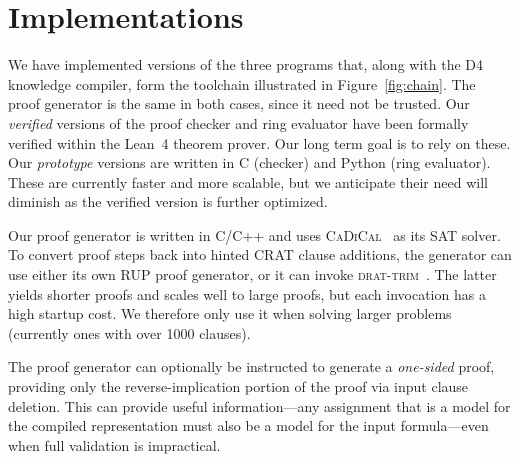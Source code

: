 \documentclass[letterpaper,USenglish,cleveref, autoref, thm-restate]{lipics-v2021}
\newcommand{\progname}[1]{\textsc{#1}}
\newcommand{\dfour}{\progname{D4}}
\newcommand{\cadical}{\progname{CaDiCal}}
\newcommand{\dtrim}{\progname{drat-trim}}
\newcommand{\lean}{Lean~4}
\begin{document}
\section{Implementations}
We have implemented versions of the three programs that, along with
the \dfour{} knowledge compiler, form the toolchain illustrated in
Figure~\ref{fig:chain}.  The proof generator is the same in both
cases, since it need not be trusted.
Our {\em verified}
versions of the proof checker and ring evaluator have been formally
verified within the \lean{} theorem prover.  Our long term goal is to
rely on these.  Our {\em prototype} versions are written in C
(checker) and Python (ring evaluator).  These are currently faster and
more scalable, but we anticipate their need will diminish as the
verified version is further optimized.

Our proof generator is written in C/C++ and uses
\cadical{}~\cite{biere-cadical-2019} as its SAT solver.  To convert
proof steps back into hinted CRAT clause additions, the generator can
use either its own RUP proof generator, or it can invoke
\dtrim{}~\cite{RAT}.  The latter yields shorter proofs and scales well
to large proofs, but each invocation has a high startup cost.  We
therefore only use it when solving larger problems (currently ones
with over 1000 clauses).

The proof generator can optionally be instructed to generate a {\em
one-sided} proof, providing only the reverse-implication portion of the proof via
input clause deletion.  This can provide useful information---any
assignment that is a model for the compiled representation
must also be a model for the input formula---even when
full validation is impractical.
\end{document}
